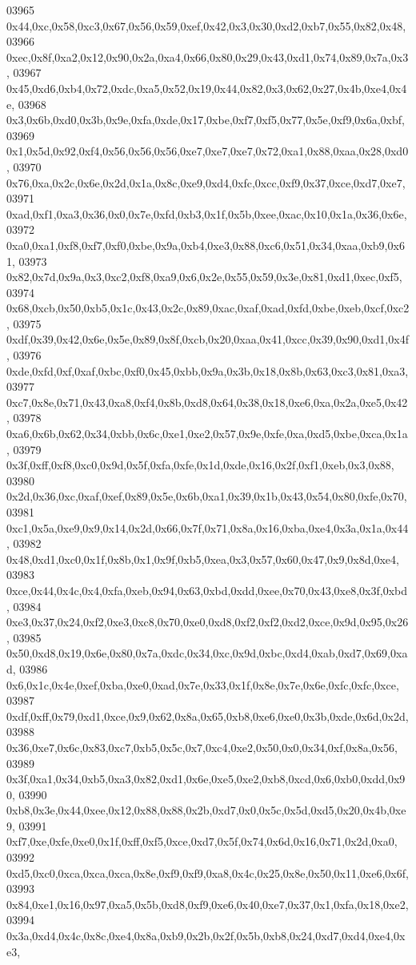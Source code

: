 \begin{DoxyCode}
03965   0x44,0xc,0x58,0xc3,0x67,0x56,0x59,0xef,0x42,0x3,0x30,0xd2,0xb7,0x55,0x82,0x48,
03966   0xec,0x8f,0xa2,0x12,0x90,0x2a,0xa4,0x66,0x80,0x29,0x43,0xd1,0x74,0x89,0x7a,0x3,
03967   0x45,0xd6,0xb4,0x72,0xdc,0xa5,0x52,0x19,0x44,0x82,0x3,0x62,0x27,0x4b,0xe4,0x4e,
03968   0x3,0x6b,0xd0,0x3b,0x9e,0xfa,0xde,0x17,0xbe,0xf7,0xf5,0x77,0x5e,0xf9,0x6a,0xbf,
03969   0x1,0x5d,0x92,0xf4,0x56,0x56,0x56,0xe7,0xe7,0xe7,0x72,0xa1,0x88,0xaa,0x28,0xd0,
03970   0x76,0xa,0x2c,0x6e,0x2d,0x1a,0x8c,0xe9,0xd4,0xfc,0xcc,0xf9,0x37,0xce,0xd7,0xe7,
03971   0xad,0xf1,0xa3,0x36,0x0,0x7e,0xfd,0xb3,0x1f,0x5b,0xee,0xac,0x10,0x1a,0x36,0x6e,
03972   0xa0,0xa1,0xf8,0xf7,0xf0,0xbe,0x9a,0xb4,0xe3,0x88,0xc6,0x51,0x34,0xaa,0xb9,0x61,
03973   0x82,0x7d,0x9a,0x3,0xc2,0xf8,0xa9,0x6,0x2e,0x55,0x59,0x3e,0x81,0xd1,0xec,0xf5,
03974   0x68,0xcb,0x50,0xb5,0x1c,0x43,0x2c,0x89,0xac,0xaf,0xad,0xfd,0xbe,0xeb,0xcf,0xc2,
03975   0xdf,0x39,0x42,0x6e,0x5e,0x89,0x8f,0xcb,0x20,0xaa,0x41,0xcc,0x39,0x90,0xd1,0x4f,
03976   0xde,0xfd,0xf,0xaf,0xbc,0xf0,0x45,0xbb,0x9a,0x3b,0x18,0x8b,0x63,0xc3,0x81,0xa3,
03977   0xc7,0x8e,0x71,0x43,0xa8,0xf4,0x8b,0xd8,0x64,0x38,0x18,0xe6,0xa,0x2a,0xe5,0x42,
03978   0xa6,0x6b,0x62,0x34,0xbb,0x6c,0xe1,0xe2,0x57,0x9e,0xfe,0xa,0xd5,0xbe,0xca,0x1a,
03979   0x3f,0xff,0xf8,0xc0,0x9d,0x5f,0xfa,0xfe,0x1d,0xde,0x16,0x2f,0xf1,0xeb,0x3,0x88,
03980   0x2d,0x36,0xc,0xaf,0xef,0x89,0x5e,0x6b,0xa1,0x39,0x1b,0x43,0x54,0x80,0xfe,0x70,
03981   0xc1,0x5a,0xe9,0x9,0x14,0x2d,0x66,0x7f,0x71,0x8a,0x16,0xba,0xe4,0x3a,0x1a,0x44,
03982   0x48,0xd1,0xc0,0x1f,0x8b,0x1,0x9f,0xb5,0xea,0x3,0x57,0x60,0x47,0x9,0x8d,0xe4,
03983   0xce,0x44,0x4c,0x4,0xfa,0xeb,0x94,0x63,0xbd,0xdd,0xee,0x70,0x43,0xe8,0x3f,0xbd,
03984   0xe3,0x37,0x24,0xf2,0xe3,0xc8,0x70,0xe0,0xd8,0xf2,0xf2,0xd2,0xce,0x9d,0x95,0x26,
03985   0x50,0xd8,0x19,0x6e,0x80,0x7a,0xdc,0x34,0xc,0x9d,0xbc,0xd4,0xab,0xd7,0x69,0xad,
03986   0x6,0x1c,0x4e,0xef,0xba,0xe0,0xad,0x7e,0x33,0x1f,0x8e,0x7e,0x6e,0xfc,0xfc,0xce,
03987   0xdf,0xff,0x79,0xd1,0xce,0x9,0x62,0x8a,0x65,0xb8,0xe6,0xe0,0x3b,0xde,0x6d,0x2d,
03988   0x36,0xe7,0x6c,0x83,0xc7,0xb5,0x5c,0x7,0xc4,0xe2,0x50,0x0,0x34,0xf,0x8a,0x56,
03989   0x3f,0xa1,0x34,0xb5,0xa3,0x82,0xd1,0x6e,0xe5,0xe2,0xb8,0xcd,0x6,0xb0,0xdd,0x90,
03990   0xb8,0x3e,0x44,0xee,0x12,0x88,0x88,0x2b,0xd7,0x0,0x5c,0x5d,0xd5,0x20,0x4b,0xe9,
03991   0xf7,0xe,0xfe,0xe0,0x1f,0xff,0xf5,0xce,0xd7,0x5f,0x74,0x6d,0x16,0x71,0x2d,0xa0,
03992   0xd5,0xc0,0xca,0xca,0xca,0x8e,0xf9,0xf9,0xa8,0x4c,0x25,0x8e,0x50,0x11,0xe6,0x6f,
03993   0x84,0xe1,0x16,0x97,0xa5,0x5b,0xd8,0xf9,0xe6,0x40,0xe7,0x37,0x1,0xfa,0x18,0xe2,
03994   0x3a,0xd4,0x4c,0x8c,0xe4,0x8a,0xb9,0x2b,0x2f,0x5b,0xb8,0x24,0xd7,0xd4,0xe4,0xe3,

\end{DoxyCode}

